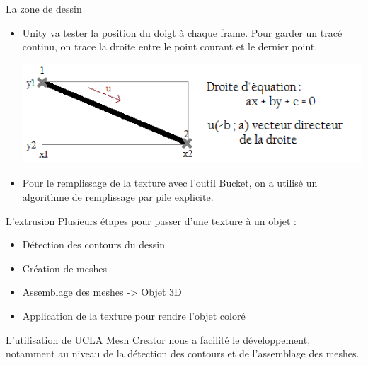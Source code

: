 \documentclass[a4paper,10pt]{beamer}
\begin{document}
	\begin{frame}{La zone de dessin}
		\begin{itemize}
		\item Unity va tester la position du doigt à chaque frame.
		Pour garder un tracé continu, on trace la droite entre le point courant et le dernier point.
		\centerline{\includegraphics[scale=0.4]{images/intro/trait.png}}
		
		\item Pour le remplissage de la texture avec l'outil Bucket, on a utilisé un algorithme de remplissage par pile explicite.
	\end{itemize}
	\end{frame}
	
	\begin{frame}{L'extrusion}
		Plusieurs étapes pour passer d'une texture à un objet :
		\begin{itemize}
			\item Détection des contours du dessin
			\item Création de meshes
			\item Assemblage des meshes -> Objet 3D
			\item Application de la texture pour rendre l'objet coloré
		\end{itemize}
		
		L'utilisation de UCLA Mesh Creator nous a facilité le développement, notamment au niveau de la détection des contours et de l'assemblage des meshes.
	\end{frame}
		
\end{document}
